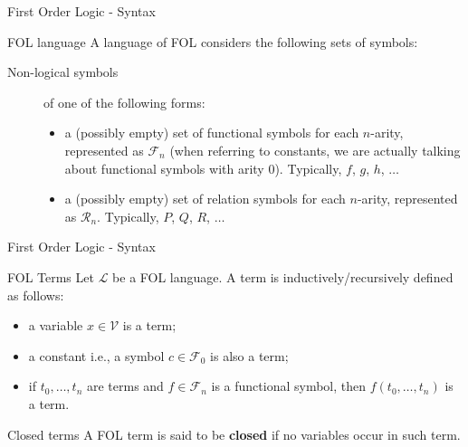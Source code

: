 \documentclass[aspectratio=169]{beamer}
\begin{document}
\begin{slide}{First Order Logic - Syntax}  

  \begin{block}{FOL language}  
    A language of FOL considers the following sets of symbols:
    \begin{description}
    \item [Non-logical symbols] of one of the following forms:
      \begin{itemize}
      \item a (possibly empty) set of functional symbols for each $n$-arity, represented as $\mathcal{F}_n$ (when referring to constants, we are actually talking about functional symbols with arity $0$). Typically, $f$, $g$, $h$, $\ldots$
      \item a (possibly empty) set of relation symbols for each $n$-arity, represented as $\mathcal{R}_n$. Typically, $P$, $Q$, $R$, $\ldots$
      \end{itemize}
    \end{description}
  \end{block}
  



\end{slide}

\begin{slide}{First Order Logic - Syntax}
  \begin{block}{FOL Terms}  
  Let $\mathcal{L}$ be a FOL language. A term is inductively/recursively defined as follows:
  \begin{itemize}
  \item a variable $x \in \mathcal{V}$ is a term;
  \item a constant i.e., a symbol $c \in \mathcal{F}_0$ is also a term;
  \item if $t_0,\ldots,t_n$ are terms and $f \in \mathcal{F}_n$ is a functional symbol, then $f(t_0,\ldots,t_n)$ is a term.  
  \end{itemize}
  \end{block}
  
  \begin{block}{Closed terms}
    A FOL term is said to be {\bf closed} if no variables occur in such term.
  \end{block}

\end{slide}
\end{document}
